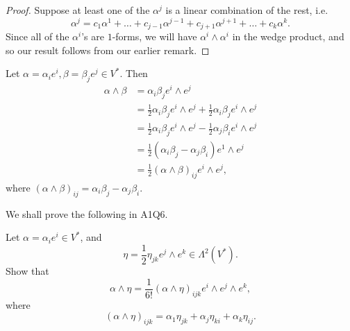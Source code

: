 \documentclass[notoc,notitlepage]{tufte-book}
\begin{document}
\begin{proof}
  Suppose at least one of the $\alpha^j$ is a linear combination of the rest, i.e.
  \begin{equation*}
    \alpha^j = c_1 \alpha^1 + \hdots + c_{j - 1} \alpha^{j - 1} +
      c_{j + 1} \alpha^{j + 1} + \hdots + c_k \alpha^k.
  \end{equation*}
  Since all of the $\alpha^i$'s are $1$-forms, we will have
  $\alpha^i \wedge \alpha^i$ in the wedge product, and so our result follows from
  our earlier remark.
\end{proof}

\begin{eg}
  Let $\alpha = \alpha_i e^i, \beta = \beta_j e^j \in V^*$. Then
  \begin{align*}
    \alpha \wedge \beta &= \alpha_i \beta_j e^i \wedge e^j \\
                        &= \frac{1}{2} \alpha_i \beta_j e^i \wedge e^j
                          + \frac{1}{2} \alpha_i \beta_j e^i \wedge e^j \\
                        &= \frac{1}{2} \alpha_i \beta_j e^i \wedge e^j
                          - \frac{1}{2} \alpha_j \beta_i e^i \wedge e^j \\
                        &= \frac{1}{2} (\alpha_i \beta_j - \alpha_j \beta_i)
                          e^1 \wedge e^j \\
                        &= \frac{1}{2} (\alpha \wedge \beta)_{ij} e^i \wedge e^j,
  \end{align*}
  where $(\alpha \wedge \beta)_{ij} = \alpha_i \beta_j - \alpha_j \beta_i$.
\end{eg}

We shall prove the following in A1Q6.

\begin{ex}
  Let $\alpha = \alpha_i e^i \in V^*$, and
  \begin{equation*}
    \eta = \frac{1}{2} \eta_{jk} e^j \wedge e^k \in \Lambda^2(V^*).
  \end{equation*}
  Show that
  \begin{equation*}
    \alpha \wedge \eta = \frac{1}{6!} (\alpha \wedge \eta)_{ijk} e^i \wedge e^j \wedge e^k,
  \end{equation*}
  where
  \begin{equation*}
    (\alpha \wedge \eta)_{ijk} = \alpha_1 \eta_{jk} + \alpha_j \eta_{ki} + \alpha_k \eta_{ij}.
  \end{equation*}
\end{ex}
\end{document}
